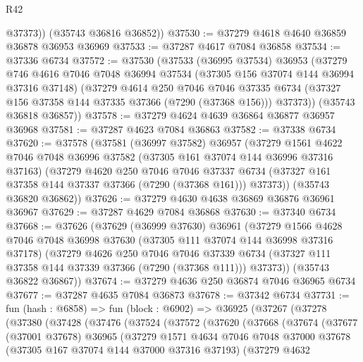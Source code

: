 \begin{lexlean}{R42}
\begin{coremodule}
{          @37373))
      (@35743 @36816 @36852))
@37530 := @37279 @4618 @4640 @36859 @36878 @36953 @36969
@37533 := @37287 @4617 @7084 @36858
@37534 := @37336 @6734
@37572 := @37530
    (@37533
      (@36995 @37534)
      @36953
      (@37279
        @746
        @4616
        @7046
        @7048
        @36994
        @37534
        (@37305 @156 @37074 @144 @36994 @37316 @37148)
        (@37279
          @4614
          @250
          @7046
          @7046
          @37335
          @6734
          (@37327 @156 @37358 @144 @37335 @37366 (@7290 (@37368 @156)))
          @37373))
      (@35743 @36818 @36857))
@37578 := @37279 @4624 @4639 @36864 @36877 @36957 @36968
@37581 := @37287 @4623 @7084 @36863
@37582 := @37338 @6734
@37620 := @37578
    (@37581
      (@36997 @37582)
      @36957
      (@37279
        @1561
        @4622
        @7046
        @7048
        @36996
        @37582
        (@37305 @161 @37074 @144 @36996 @37316 @37163)
        (@37279
          @4620
          @250
          @7046
          @7046
          @37337
          @6734
          (@37327 @161 @37358 @144 @37337 @37366 (@7290 (@37368 @161)))
          @37373))
      (@35743 @36820 @36862))
@37626 := @37279 @4630 @4638 @36869 @36876 @36961 @36967
@37629 := @37287 @4629 @7084 @36868
@37630 := @37340 @6734
@37668 := @37626
    (@37629
      (@36999 @37630)
      @36961
      (@37279
        @1566
        @4628
        @7046
        @7048
        @36998
        @37630
        (@37305 @111 @37074 @144 @36998 @37316 @37178)
        (@37279
          @4626
          @250
          @7046
          @7046
          @37339
          @6734
          (@37327 @111 @37358 @144 @37339 @37366 (@7290 (@37368 @111)))
          @37373))
      (@35743 @36822 @36867))
@37674 := @37279 @4636 @250 @36874 @7046 @36965 @6734
@37677 := @37287 @4635 @7084 @36873
@37678 := @37342 @6734
@37731 := fun (hash : @6858) =>
  fun (block : @6902) =>
  @36925
    (@37267
      (@37278
        (@37380
          (@37428
            (@37476
              (@37524
                (@37572
                  (@37620
                    (@37668
                      (@37674
                        (@37677
                          (@37001 @37678)
                          @36965
                          (@37279
                            @1571
                            @4634
                            @7046
                            @7048
                            @37000
                            @37678
                            (@37305 @167 @37074 @144 @37000 @37316 @37193)
                            (@37279
                              @4632
}
\end{coremodule}
\end{lexlean}
